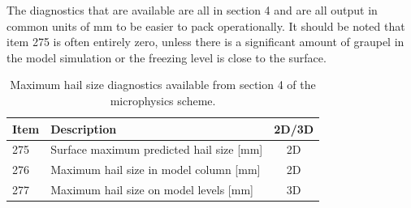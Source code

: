 \documentclass{UMDP_article}
\begin{document}
The diagnostics that are available are all in section 4 and are all output in
common units of mm to be easier to pack operationally. It should be noted
that item 275 is often entirely zero, unless there is a significant amount
of graupel in the model simulation or the freezing level is close to the
surface. 
\begin{table}[h!]
\begin{center}
\begin{tabular}{|l|l|c|}
\hline
Item & Description & 2D/3D \\
\hline
275  & Surface maximum predicted hail size [mm]  & 2D \\ 
276  & Maximum hail size in model column [mm] & 2D \\
277  & Maximum hail size on model levels [mm] & 3D \\  
\hline
\end{tabular}
\caption{\label{tab:max_hail_size} Maximum hail size diagnostics available from
section 4 of the microphysics scheme.}
\end{center}
\end{table}

\clearpage
{}
{}


\end{document}
